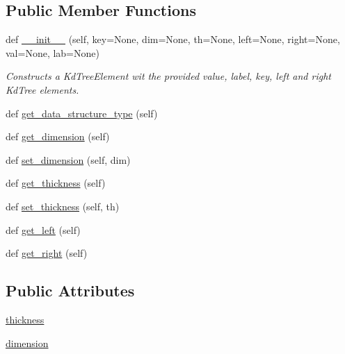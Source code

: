 \subsection*{Public Member Functions}
\begin{DoxyCompactItemize}
\item 
def \mbox{\hyperlink{class_bridges_1_1kd__tree__element_1_1_k_d_tree_element_abbcf996ed59849ba4e656ec2e002866e}{\+\_\+\+\_\+init\+\_\+\+\_\+}} (self, key=None, dim=None, th=None, left=None, right=None, val=None, lab=None)
\begin{DoxyCompactList}\small\item\em Constructs a Kd\+Tree\+Element wit the provided value, label, key, left and right Kd\+Tree elements. \end{DoxyCompactList}\item 
def \mbox{\hyperlink{class_bridges_1_1kd__tree__element_1_1_k_d_tree_element_a2a835a57fdbcbad9f24f49421756b923}{get\+\_\+data\+\_\+structure\+\_\+type}} (self)
\item 
def \mbox{\hyperlink{class_bridges_1_1kd__tree__element_1_1_k_d_tree_element_a4ef9a82d8bb407f7e802fad23f0406ab}{get\+\_\+dimension}} (self)
\item 
def \mbox{\hyperlink{class_bridges_1_1kd__tree__element_1_1_k_d_tree_element_ae2c2dc60e110fbe64edd0e9b4a55094f}{set\+\_\+dimension}} (self, dim)
\item 
def \mbox{\hyperlink{class_bridges_1_1kd__tree__element_1_1_k_d_tree_element_a5148bf0c4272f62d7c055ebf2a6a6ede}{get\+\_\+thickness}} (self)
\item 
def \mbox{\hyperlink{class_bridges_1_1kd__tree__element_1_1_k_d_tree_element_ac100a47f4743452747c002dfda86e2b7}{set\+\_\+thickness}} (self, th)
\item 
def \mbox{\hyperlink{class_bridges_1_1kd__tree__element_1_1_k_d_tree_element_a0190cbbb6e52833d711be493af5bb2aa}{get\+\_\+left}} (self)
\item 
def \mbox{\hyperlink{class_bridges_1_1kd__tree__element_1_1_k_d_tree_element_ac02fbf728853a590d59e042110b9ce29}{get\+\_\+right}} (self)
\end{DoxyCompactItemize}
\subsection*{Public Attributes}
\begin{DoxyCompactItemize}
\item 
\mbox{\hyperlink{class_bridges_1_1kd__tree__element_1_1_k_d_tree_element_a530b78c2dcb601a9345b195c1b882d30}{thickness}}
\item 
\mbox{\hyperlink{class_bridges_1_1kd__tree__element_1_1_k_d_tree_element_ab5457d652eacbce763c8760b512ac7d7}{dimension}}
\end{DoxyCompactItemize}


